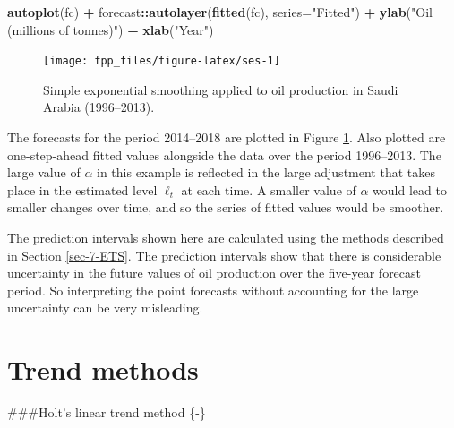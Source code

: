 \documentclass[]{book}
\newenvironment{Shaded}{\begin{snugshade}}{\end{snugshade}}
\newcommand{\DataTypeTok}[1]{\textcolor[rgb]{0.13,0.29,0.53}{#1}}
\newcommand{\KeywordTok}[1]{\textcolor[rgb]{0.13,0.29,0.53}{\textbf{#1}}}
\newcommand{\NormalTok}[1]{#1}
\newcommand{\OperatorTok}[1]{\textcolor[rgb]{0.81,0.36,0.00}{\textbf{#1}}}
\newcommand{\StringTok}[1]{\textcolor[rgb]{0.31,0.60,0.02}{#1}}
\begin{document}
\begin{Shaded}
\begin{Highlighting}[]
\KeywordTok{autoplot}\NormalTok{(fc) }\OperatorTok{+}
\StringTok{  }\NormalTok{forecast}\OperatorTok{::}\KeywordTok{autolayer}\NormalTok{(}\KeywordTok{fitted}\NormalTok{(fc), }\DataTypeTok{series=}\StringTok{"Fitted"}\NormalTok{) }\OperatorTok{+}
\StringTok{  }\KeywordTok{ylab}\NormalTok{(}\StringTok{"Oil (millions of tonnes)"}\NormalTok{) }\OperatorTok{+}\StringTok{ }\KeywordTok{xlab}\NormalTok{(}\StringTok{"Year"}\NormalTok{)}
\end{Highlighting}
\end{Shaded}

\begin{figure}

{\centering \texttt{[image: fpp\_files/figure-latex/ses-1]} 

}

\caption{Simple exponential smoothing applied to oil production in Saudi Arabia (1996--2013).}\label{fig:ses}
\end{figure}

The forecasts for the period 2014--2018 are plotted in Figure \ref{fig:ses}. Also plotted are one-step-ahead fitted values alongside the data over the period 1996--2013. The large value of \(\alpha\) in this example is reflected in the large adjustment that takes place in the estimated level \(\ell_t\) at each time. A smaller value of \(\alpha\) would lead to smaller changes over time, and so the series of fitted values would be smoother.

The prediction intervals shown here are calculated using the methods described in Section \ref{sec-7-ETS}. The prediction intervals show that there is considerable uncertainty in the future values of oil production over the five-year forecast period. So interpreting the point forecasts without accounting for the large uncertainty can be very misleading.

\hypertarget{sec-7-trendmethods}{%
\section{Trend methods}\label{sec-7-trendmethods}}

\#\#\#Holt's linear trend method \{-\}
\end{document}
